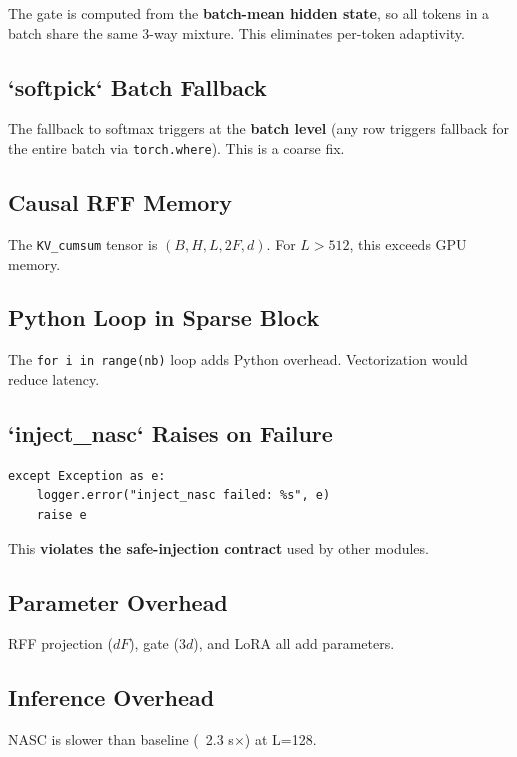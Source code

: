 The gate is computed from the \textbf{batch-mean hidden state}, so all tokens 
in a batch share the same 3-way mixture. This eliminates per-token 
adaptivity.

\subsection{`softpick` Batch Fallback}

The fallback to softmax triggers at the \textbf{batch level} (any row triggers 
fallback for the entire batch via \texttt{torch.where}). This is a coarse fix.

\subsection{Causal RFF Memory}

The \texttt{KV\_cumsum} tensor is $(B, H, L, 2F, d)$. For $L > 512$, this exceeds 
GPU memory.

\subsection{Python Loop in Sparse Block}

The \texttt{for i in range(nb)} loop adds Python overhead. Vectorization would 
reduce latency.

\subsection{`inject\_nasc` Raises on Failure}

\begin{lstlisting}
except Exception as e:
    logger.error("inject_nasc failed: %s", e)
    raise e
\end{lstlisting}

This \textbf{violates the safe-injection contract} used by other modules.

\subsection{Parameter Overhead}

RFF projection ($dF$), gate ($3d$), and LoRA all add parameters.

\subsection{Inference Overhead}

NASC is slower than baseline (~2.3 s$\times$) at L=128.

